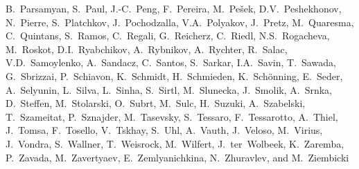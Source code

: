 \begin{flushleft}
B.~Parsamyan\CorAuth,
S.~Paul,
J.-C.~Peng,
F.~Pereira,
M.~Pe{\v s}ek,
D.V.~Peshekhonov, %
N.~Pierre,
S.~Platchkov,
J.~Pochodzalla,
V.A.~Polyakov,
J.~Pretz,
M.~Quaresma,
C.~Quintans,
S.~Ramos,
C.~Regali,
G.~Reicherz,
C.~Riedl,
N.S.~Rogacheva,  %
M.~Roskot,
D.I.~Ryabchikov,
A.~Rybnikov, %
A.~Rychter,
R.~Salac,
V.D.~Samoylenko,
A.~Sandacz,
C.~Santos,
S.~Sarkar,
I.A.~Savin, %
T.~Sawada,
G.~Sbrizzai,
P.~Schiavon,
K.~Schmidt,
H.~Schmieden,
K.~Sch\"onning,
E.~Seder,
A.~Selyunin, %
L.~Silva,
L.~Sinha,
S.~Sirtl,
M.~Slunecka, %
J.~Smolik, %
A.~Srnka,
D.~Steffen,
M.~Stolarski,
O.~Subrt,
M.~Sulc,
H.~Suzuki,
A.~Szabelski,
T.~Szameitat,
P.~Sznajder,
M.~Tasevsky, %
S.~Tessaro,
F.~Tessarotto,
A.~Thiel,
J.~Tomsa,
F.~Tosello,
V.~Tskhay,
S.~Uhl,
A.~Vauth,
J.~Veloso,
M.~Virius,
J.~Vondra,
S.~Wallner,
T.~Weisrock,
M.~Wilfert,
J.~ter~Wolbeek,
K.~Zaremba,
P.~Zavada, %
M.~Zavertyaev,
E.~Zemlyanichkina, %
N.~Zhuravlev, and %
M.~Ziembicki 
\end{flushleft}
%
%
